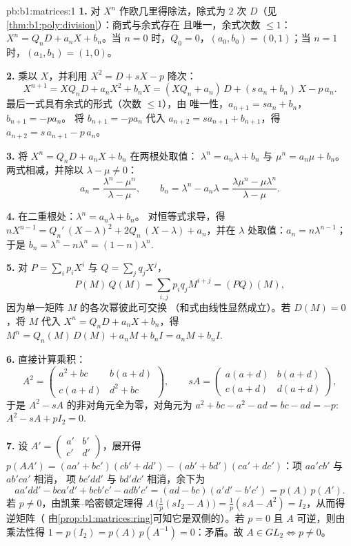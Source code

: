 \begin{solution}{pb:b1:matrices:1}
\textbf{1.} 对 $X^n$ 作欧几里得除法，除式为 $2$ 次
$D$（见\cref{thm:b1:poly:division}）：商式与余式存在
且唯一，余式次数 $\leq 1$：$X^n =
Q_n D + a_n X + b_n$。当 $n = 0$ 时，$Q_0 = 0$，$(a_0, b_0) = (0,
1)$；当 $n = 1$ 时，$(a_1, b_1) = (1, 0)$。

\textbf{2.} 乘以 $X$，并利用 $X^2 = D + sX - p$ 降次：
\[
X^{n+1} = X Q_n D + a_n X^2 + b_n X
= (X Q_n + a_n)\,D + (s\,a_n + b_n)\,X - p\,a_n .
\]
最后一式具有余式的形式（次数 $\leq 1$），由
唯一性，$a_{n+1} = s a_n + b_n$，$b_{n+1} = -p a_n$。
将 $b_{n+1} = -pa_n$ 代入 $a_{n+2} = s a_{n+1} +
b_{n+1}$，得 $a_{n+2} = s\,a_{n+1} - p\,a_n$。

\textbf{3.} 将 $X^n = Q_n D + a_n X + b_n$ 在两根处取值：
$\lambda^n = a_n\lambda + b_n$ 与 $\mu^n = a_n\mu + b_n$。
两式相减，并除以 $\lambda - \mu \neq 0$：
\[
a_n = \frac{\lambda^n - \mu^n}{\lambda - \mu},
\qquad
b_n = \lambda^n - a_n\lambda
= \frac{\lambda\mu^n - \mu\lambda^n}{\lambda - \mu} .
\]

\textbf{4.} 在二重根处：$\lambda^n = a_n\lambda + b_n$。
对恒等式求导，得 $nX^{n-1} = Q_n'\,(X - \lambda)^2
+ 2Q_n\,(X - \lambda) + a_n$，并在 $\lambda$ 处取值：$a_n
= n\lambda^{n-1}$；于是 $b_n = \lambda^n - n\lambda^{n} = (1 -
n)\lambda^{n}$.

\textbf{5.} 对 $P = \sum_i p_i X^i$ 与 $Q = \sum_j q_j X^j$，
\[
P(M)\,Q(M) = \sum_{i,j} p_i q_j M^{i+j} = (PQ)(M),
\]
因为单一矩阵 $M$ 的各次幂彼此可交换
（和式由线性显然成立）。若 $D(M) = 0$，将 $M$
代入 $X^n = Q_n D + a_n X + b_n$，得 $M^n = Q_n(M)\,D(M) + a_n
M + b_n I = a_n M + b_n I$.

\textbf{6.} 直接计算乘积：
\[
A^2 = \begin{pmatrix}
a^2 + bc & b(a + d)\\
c(a + d) & d^2 + bc
\end{pmatrix},
\qquad
s A = \begin{pmatrix}
a(a+d) & b(a+d)\\
c(a+d) & d(a+d)
\end{pmatrix},
\]
于是 $A^2 - sA$ 的非对角元全为零，对角元为
$a^2 + bc - a^2 - ad = bc - ad = -p$: $A^2 - sA + pI_2 = 0$.

\textbf{7.} 设 $A' = \begin{pmatrix} a' & b'\\ c' &
d'\end{pmatrix}$，展开得 $p(AA') = (aa' + bc')(cb' + dd') -
(ab' + bd')(ca' + dc')$：项 $aa'cb'$ 与 $ab'ca'$ 相消，
项 $bc'dd'$ 与 $bd'dc'$ 相消，余下为
\[
aa'dd' - bca'd' + bcb'c' - adb'c'
= (ad - bc)(a'd' - b'c') = p(A)\,p(A').
\]
若 $p \neq 0$，由凯莱--哈密顿定理得 $A\,\bigl(\tfrac1p(sI_2 -
A)\bigr) = \tfrac1p(sA - A^2) = I_2$，从而得逆矩阵（
由\cref{prop:b1:matrices:ring}可知它是双侧的）。若 $p = 0$ 且
$A$ 可逆，则由乘法性得 $1 = p(I_2) =
p(A)\,p(A^{-1}) = 0$：矛盾。故 $A \in GL_2 \iff p \neq 0$。


\end{solution}
